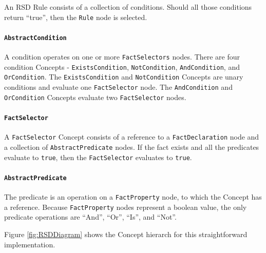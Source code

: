 An RSD Rule consists of a collection of conditions.
Should all those conditions return ``true'', then the \texttt{Rule} node is selected.

\paragraph{\texttt{AbstractCondition}} A condition operates on one or more \texttt{FactSelectors} nodes.
There are four condition Concepts - \texttt{ExistsCondition}, \texttt{NotCondition}, \texttt{AndCondition}, and \texttt{OrCondition}.
The \texttt{ExistsCondition} and \texttt{NotCondition} Concepts are unary conditions and evaluate one \texttt{FactSelector} node.
The \texttt{AndCondition} and \texttt{OrCondition} Concepts evaluate two \texttt{FactSelector} nodes.

\paragraph{\texttt{FactSelector}} A \texttt{FactSelector} Concept consists of a reference to a \texttt{FactDeclaration} node and a collection of \texttt{AbstractPredicate} nodes.
If the fact exists and all the predicates evaluate to \texttt{true}, then the \texttt{FactSelector} evaluates to \texttt{true}.

\paragraph{\texttt{AbstractPredicate}} The predicate is an operation on a \texttt{FactProperty} node, to which the Concept has a reference.
Because \texttt{FactProperty} nodes represent a boolean value, the only predicate operations are ``And'', ``Or'', ``Is'', and ``Not''.

Figure \ref{fig:RSDDiagram} shows the Concept hierarch for this straightforward implementation.

